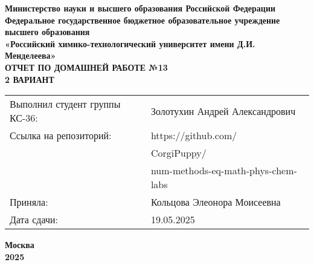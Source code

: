 \documentclass[12pt, a4paper]{report}
\begin{document}
	\begin{titlepage}
		\begin{center}
			\large \textbf{Министерство науки и высшего образования Российской Федерации} \\
			\large \textbf{Федеральное государственное бюджетное образовательное учреждение высшего образования} \\
			\large \textbf{«Российский химико-технологический университет имени Д.И. Менделеева»} \\

			\vspace*{4cm}
			\LARGE \textbf{ОТЧЕТ ПО ДОМАШНЕЙ РАБОТЕ №13} \\
			\Large \textbf{2 ВАРИАНТ}

			\vspace*{3cm}
			\begin{flushright}
				\Large
				\begin{tabular}{>{\raggedleft\arraybackslash}p{9cm} p{10cm}}
					Выполнил студент группы КС-36: & Золотухин Андрей Александрович \\
					Ссылка на репозиторий: & https://github.com/ \\
					& CorgiPuppy/ \\
					& num-methods-eq-math-phys-chem-labs \\
					Приняла: & Кольцова Элеонора Моисеевна \\
					Дата сдачи: & 19.05.2025 \\
				\end{tabular}
			\end{flushright}

			\vspace*{6cm}
			\Large \textbf{Москва \\ 2025}
		\end{center}
	\end{titlepage}

	\tableofcontents
	\thispagestyle{empty}
	\newpage

\end{document}
